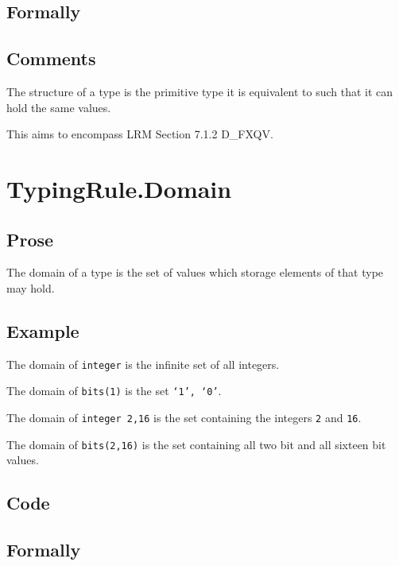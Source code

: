 \documentclass{book}
\begin{document}
\begin{emptyformal}
      \subsection{Formally}
\end{emptyformal}
    \subsection{Comments}
    The structure of a type is the primitive type it is equivalent to such that
    it can hold the same values. 

    This aims to encompass LRM Section 7.1.2 D\_FXQV.

\section{TypingRule.Domain}

  \subsection{Prose}
  The domain of a type is the set of values which storage elements of that type
may hold. 

  \subsection{Example}
  The domain of \texttt{integer} is the infinite set of all integers.

  The domain of \texttt{bits(1)} is the set \texttt{{‘1’, ‘0’}}.

  The domain of \texttt{integer {2,16}} is the set containing the integers \texttt{2} and \texttt{16}.

  The domain of \texttt{bits({2,16})} is the set containing all two bit and all sixteen bit values.

  \subsection{Code}

\begin{emptyformal}
      \subsection{Formally}
\end{emptyformal}
\end{document}
